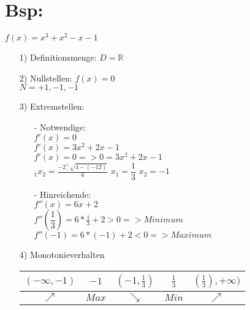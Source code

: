 \documentclass[.../mainfile.tex]{subfiles}
\begin{document}
	\section*{Bsp:} $f(x)=x^3+x^2-x-1$
	\begin{itemize}
		\item[1)] Definitionsmenge: $D=\mathbb{R}$
		\item[2)] Nullstellen: $f(x)=0$\\
			$N= +1, -1, -1$
		\item[3)] Extremstellen:  
		\begin{itemize}
			\item[-] Notwendige:\\
			$f'(x)=0$\\
			$f'(x)=3x^2+2x-1$\\
			$f'(x)=0 => 0=3x^2+2x-1$\\
			$_{1}x_{2}=\frac{-2_{-}^{+}\sqrt{4-(-12)}}{6}$
			$x_{1}=\dfrac{1}{3}$
			$x_{2}=-1$
			\item[-] Hinreichende:\\
			$f''(x)=6x+2$\\
			$f''(\dfrac{1}{3})=6*\frac{1}{3}+2>0 => Minimum$\\
			$f''(-1)=6*(-1)+2<0 => Maximum$
		\end{itemize}
		\item[4)] Monotonieverhalten\\
		\begin{tabular}{c|c|c|c|c}
			$(-\infty, -1)$ & $-1$ & $(-1, \frac{1}{3})$ & $\frac{1}{3}$ & $(\frac{1}{3}), +\infty)$ \\ 
			\hline
			$\nearrow$ & $Max$ & $\searrow$ & $Min$ & $\nearrow$ \\ 
		\end{tabular}
	\end{itemize}
	
	
	
	
	
	
	
	
\end{document}
